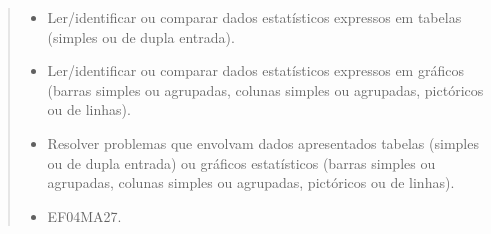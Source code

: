 \begin{mdframed}[linewidth=2pt,linecolor=salmao,roundcorner=2pt]
\begin{itemize}
{\begin{itemize}
\begin{escolha}
{\begin{quote}
{\begin{escolha}
{{

\begin{itemize}
\item Ler/identificar ou comparar dados estatísticos expressos em tabelas
(simples ou de dupla entrada).
\item Ler/identificar ou comparar dados estatísticos expressos em gráficos
(barras simples ou agrupadas, colunas simples ou agrupadas, pictóricos
ou de linhas).
\item Resolver problemas que envolvam dados apresentados tabelas (simples ou
de dupla entrada) ou gráficos estatísticos (barras simples ou agrupadas,
colunas simples ou agrupadas, pictóricos ou de linhas).
\end{itemize}


\begin{itemize}
\item EF04MA27.
\end{itemize}

}}
\end{escolha}}
\end{quote}}
\end{escolha}
\end{itemize}}
\end{itemize}
\end{mdframed}
